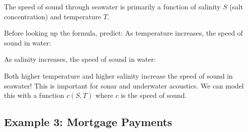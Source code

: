 \documentclass{ximera}
\begin{document}
\begin{problem}
The speed of sound through seawater is primarily a function of salinity $S$ (salt concentration) and temperature $T$.

Before looking up the formula, predict: As temperature increases, the speed of sound in water:
\begin{multipleChoice}
\end{multipleChoice}

As salinity increases, the speed of sound in water:
\begin{multipleChoice}
\end{multipleChoice}

\begin{feedback}
Both higher temperature and higher salinity increase the speed of sound in seawater! This is important for sonar and underwater acoustics. We can model this with a function $c(S, T)$ where $c$ is the speed of sound.
\end{feedback}
\end{problem}

\subsection*{Example 3: Mortgage Payments}
\end{document}
